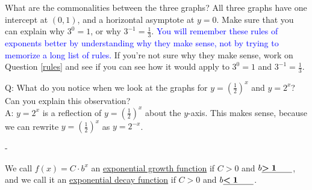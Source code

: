 \documentclass{article}
\makeatletter
\newlength{\tipmargin}
\renewenvironment{framed}{
  \setlength{\tipmargin}{\textwidth-\linewidth}
  \advance\@totalleftmargin-\tipmargin
  \def\FrameCommand{\hspace{\tipmargin}\fbox}%
  \advance\linewidth\tipmargin
  \MakeFramed {\advance\hsize-\width \FrameRestore}%
}
{\endMakeFramed}
\makeatother
\begin{document}
\begin{enumerate}[resume]
\begin{solution}
\begin{center}
    \end{center} 
    What are the commonalities between the three graphs? 
    All three graphs have one intercept at $(0, 1)$, and a horizontal asymptote at $y=0$.      
    Make sure that you can explain why $3^0 = 1$, or why $3^{-1} = \frac{1}{3}$.
    \textcolor{blue}{You will remember these rules of exponents better by understanding
    why they make sense, not by trying to memorize a long list of rules.} If you're not
    sure why they make sense, work on Question \ref{rules} and see if you can
    see how it would apply to $3^0=1$ and $3^{-1}=\frac{1}{3}$.

    Q: What do you notice when we look at the graphs for  $y=(\frac{1}{2})^x$ and $y=2^x$? Can you explain this observation? \\ A: $y=2^x$ is a reflection of $y=(\frac{1}{2})^x$ about the $y$-axis. This makes sense, because we can rewrite $y=(\frac{1}{2})^x$ as $y=2^{-x}$.

  \end{solution}

\end{enumerate}
\begin{framed}
  We call $f(x) = C \cdot b^x$ an \uline{exponential growth function} if $C > 0$ and $b \fitb{0.5in}{> 1}$, and we call it an \uline{exponential decay function} if $C > 0$ and $b \fitb{0.5in}{< 1}$. 
\end{framed}
\end{document}
